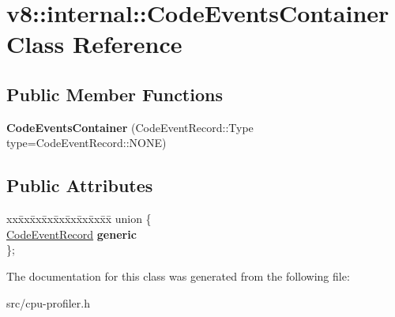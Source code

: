 \hypertarget{classv8_1_1internal_1_1_code_events_container}{}\section{v8\+:\+:internal\+:\+:Code\+Events\+Container Class Reference}
\label{classv8_1_1internal_1_1_code_events_container}
\subsection*{Public Member Functions}
\begin{DoxyCompactItemize}
\item 
\hypertarget{classv8_1_1internal_1_1_code_events_container_a577663fbea6f921aa1a7054eaf4c98b1}{}{\bfseries Code\+Events\+Container} (Code\+Event\+Record\+::\+Type type=Code\+Event\+Record\+::\+N\+O\+N\+E)\label{classv8_1_1internal_1_1_code_events_container_a577663fbea6f921aa1a7054eaf4c98b1}

\end{DoxyCompactItemize}
\subsection*{Public Attributes}
\begin{DoxyCompactItemize}
\item 
\hypertarget{classv8_1_1internal_1_1_code_events_container_aa1c6487bb88a7300c0857a28ec1c9f10}{}\begin{tabbing}
xx\=xx\=xx\=xx\=xx\=xx\=xx\=xx\=xx\=\kill
union \{\\
\>\hyperlink{classv8_1_1internal_1_1_code_event_record}{CodeEventRecord} {\bfseries generic}\\
\}; \label{classv8_1_1internal_1_1_code_events_container_aa1c6487bb88a7300c0857a28ec1c9f10}
\\

\end{tabbing}\end{DoxyCompactItemize}


The documentation for this class was generated from the following file\+:\begin{DoxyCompactItemize}
\item 
src/cpu-\/profiler.\+h\end{DoxyCompactItemize}
